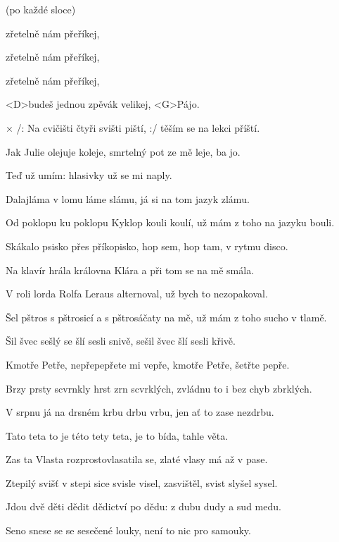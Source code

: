 

\zr
(po každé sloce)

 zřetelně nám přeříkej,

 zřetelně nám přeříkej,

 zřetelně nám přeříkej,

<D>budeš jednou zpěvák velikej, <G>Pájo.
\kr

× /: Na cvičišti čtyři svišti piští, :/ těším se na lekci příští.
\ks

\zs
Jak Julie olejuje koleje, smrtelný pot ze mě leje, ba jo.
\ks

\zs
Teď už umím:  hlasivky už se mi naply.
\ks

\zs
Dalajláma v lomu láme slámu, já si na tom jazyk zlámu.
\ks

\zs
Od poklopu ku poklopu Kyklop kouli koulí, už mám z toho na jazyku bouli.
\ks

\zs
Skákalo psisko přes příkopisko, hop sem, hop tam, v rytmu disco.
\ks

\zs
Na klavír hrála královna Klára a při tom se na mě smála.
\ks

\zs
V roli lorda Rolfa Leraus alternoval, už bych to nezopakoval.
\ks

\zs
Šel pštros s pštrosicí a s pštrosáčaty na mě, už mám z toho sucho v tlamě.
\ks

\zs
Šil švec sešlý se šlí sesli snivě, sešil švec šlí sesli křivě.
\ks

\zs
Kmotře Petře, nepřepepřete mi vepře, kmotře Petře, šetřte pepře.
\ks

\zs
Brzy prsty scvrnkly hrst zrn scvrklých, zvládnu to i bez chyb zbrklých.
\ks

\zs
V srpnu já na drsném krbu drbu vrbu, jen ať to zase nezdrbu.
\ks

\zs
Tato teta to je této tety teta, je to bída, tahle věta.
\ks

\zs
Zas ta Vlasta rozprostovlasatila se, zlaté vlasy má až v pase.
\ks

\zs
Ztepilý svišť v stepi sice svisle visel, zasvištěl, svist slyšel sysel.
\ks

\zs
Jdou dvě děti dědit dědictví po dědu: z dubu dudy a sud medu.
\ks

\zs
Seno snese se se sesečené louky, není to nic pro samouky.
\ks

\kp
